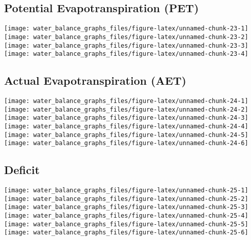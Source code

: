 \documentclass[
]{article}
\begin{document}
\hypertarget{potential-evapotranspiration-pet}{%
\subsection{Potential Evapotranspiration
(PET)}\label{potential-evapotranspiration-pet}}

\texttt{[image: water\_balance\_graphs\_files/figure-latex/unnamed-chunk-23-1]}
\texttt{[image: water\_balance\_graphs\_files/figure-latex/unnamed-chunk-23-2]}
\texttt{[image: water\_balance\_graphs\_files/figure-latex/unnamed-chunk-23-3]}
\texttt{[image: water\_balance\_graphs\_files/figure-latex/unnamed-chunk-23-4]}

\hypertarget{actual-evapotranspiration-aet}{%
\subsection{Actual Evapotranspiration
(AET)}\label{actual-evapotranspiration-aet}}

\texttt{[image: water\_balance\_graphs\_files/figure-latex/unnamed-chunk-24-1]}
\texttt{[image: water\_balance\_graphs\_files/figure-latex/unnamed-chunk-24-2]}
\texttt{[image: water\_balance\_graphs\_files/figure-latex/unnamed-chunk-24-3]}
\texttt{[image: water\_balance\_graphs\_files/figure-latex/unnamed-chunk-24-4]}
\texttt{[image: water\_balance\_graphs\_files/figure-latex/unnamed-chunk-24-5]}
\texttt{[image: water\_balance\_graphs\_files/figure-latex/unnamed-chunk-24-6]}

\hypertarget{deficit}{%
\subsection{Deficit}\label{deficit}}

\texttt{[image: water\_balance\_graphs\_files/figure-latex/unnamed-chunk-25-1]}
\texttt{[image: water\_balance\_graphs\_files/figure-latex/unnamed-chunk-25-2]}
\texttt{[image: water\_balance\_graphs\_files/figure-latex/unnamed-chunk-25-3]}
\texttt{[image: water\_balance\_graphs\_files/figure-latex/unnamed-chunk-25-4]}
\texttt{[image: water\_balance\_graphs\_files/figure-latex/unnamed-chunk-25-5]}
\texttt{[image: water\_balance\_graphs\_files/figure-latex/unnamed-chunk-25-6]}
\end{document}
